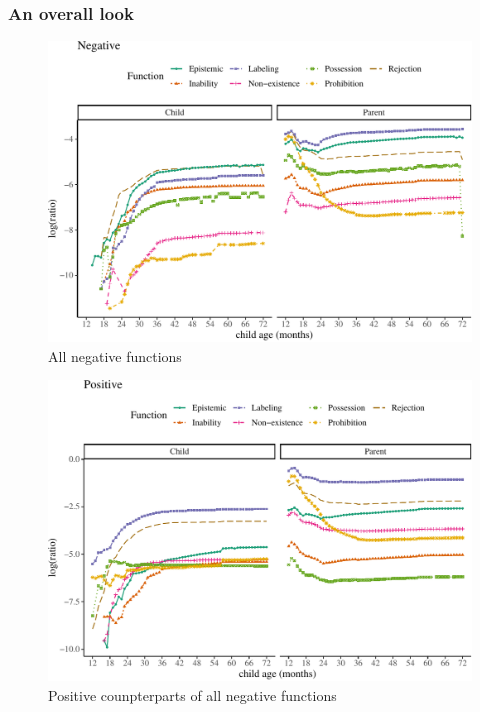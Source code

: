 \documentclass[
  english,
  man,floatsintext]{apa6}
\begin{document}
\clearpage

\hypertarget{an-overall-look}{%
\subsubsection{An overall look}\label{an-overall-look}}

\begin{figure}[H]

{\centering \includegraphics{neg_construction_article_files/figure-latex/allneg-1} 

}

\caption{All negative functions}\label{fig:allneg}
\end{figure}

\clearpage

\begin{figure}[H]

{\centering \includegraphics{neg_construction_article_files/figure-latex/allpos-1} 

}

\caption{Positive counpterparts of all negative functions}\label{fig:allpos}
\end{figure}
\end{document}
